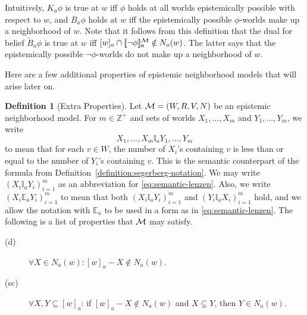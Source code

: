 \documentclass[12pt]{article}
\newcommand{\XXXcomment}[1]{}
\newcommand{\XXXcomment}[1]{\marginpar{\color{blue}{\footnotesize #1}}}
\theoremstyle{definition}
\newtheorem{definition}[theorem]{Definition}
\newcommand{\Int}{\mathbb{Z}}  %
\newcommand{\M}{{\cal M}}      %
\newcommand{\Lang}{{\cal L}}   %
\newcommand{\KB}{{\mathsf{KB}}}                        %
\newcommand{\semn}[1]{\llbracket{#1}\rrbracket_{\mathsf{n}}} %
\begin{document}
Intuitively, $K_a\phi$ is true at $w$ iff $\phi$ holds at all worlds
epistemically possible with respect to $w$, and $B_a\phi$ holds at $w$
iff the epistemically possible $\phi$-worlds make up a neighborhood of
$w$.  Note that it follows from this definition that the dual for
belief $\check{B}_a \phi$ is true at $w$ iff
$[w]_a\cap\semn{\neg\phi}^\M\notin N_a(w)$.  The latter says that the
epistemically possible $\lnot\phi$-worlds do not make up a
neighborhood of $w$.

\XXXcomment{BR: added extra sentence at end of paragraph just above.
  This says in words what $\check B_a\phi$ means.}

Here are a few additional properties of epistemic neighborhood models
that will arise later on.

\begin{definition}[Extra Properties]
  \label{definition:extra-properties}
  Let $\M=(W,R,V,N)$ be an epistemic neighborhood model.  
  For $m\in\Int^+$ and sets
  of worlds $X_1,\dots,X_m$ and $Y_1,\dots,Y_m$,
  we write
  \begin{equation}
    X_1,\dots,X_m\mathbb{I}_aY_1,\dots,Y_m
    \label{eq:semantic-lenzen}
  \end{equation}
  to mean that for each $v\in W$, the number of $X_i$'s containing $v$
  is less than or equal to the number of $Y_i$'s containing $v$. This is the
  semantic counterpart of the formula from
  Definition~\ref{definition:segerberg-notation}.  We may write
  $(X_i\mathbb{I}_aY_i)_{i=1}^m$ as an abbreviation for
  \eqref{eq:semantic-lenzen}.  Also, we write
  $(X_i\mathbb{E}_aY_i)_{i=1}^m$ to mean that both
  $(X_i\mathbb{I}_aY_i)_{i=1}^m$ and $(Y_i\mathbb{I}_aX_i)_{i=1}^m$
  hold, and we allow the notation with $\mathbb{E}_a$ to be used in a
  form as in \eqref{eq:semantic-lenzen}.  The following is a list of
  properties that $\M$ may satisfy.
  \begin{description}
  \item[(d)] $\forall X \in N_a(w): [w]_a - X \notin  N_a(w)$.

 
  \item[(sc)] $\forall X,Y\subseteq[w]_a$:
    if $[w]_a-X\notin N_a(w)$ and $X\subsetneq Y$, then
    $Y\in N_a(w)$.


\end{description}
\end{definition}
\end{document}
